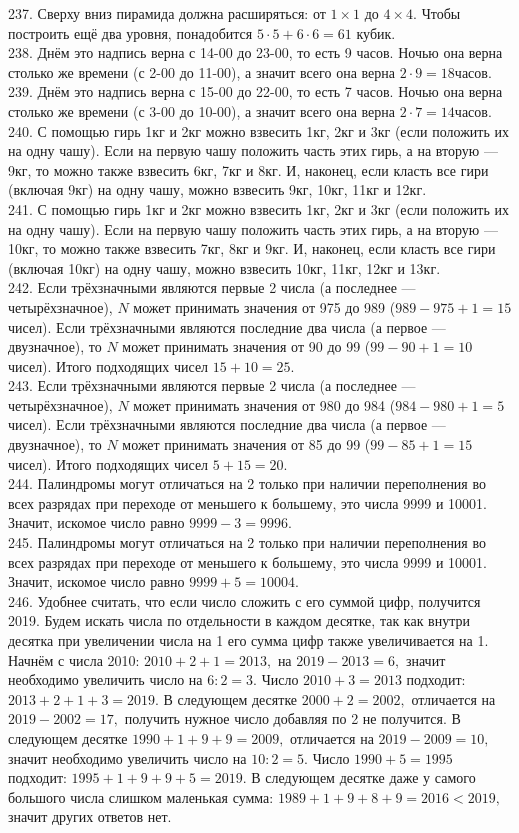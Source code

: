 \documentclass[12pt]{article}
\begin{document}
237. Сверху вниз пирамида должна расширяться: от $1\times1$ до $4\times4.$ Чтобы построить ещё два уровня, понадобится $5\cdot5+6\cdot6=61$ кубик.\\
238. Днём это надпись верна с 14-00 до 23-00, то есть 9 часов. Ночью она верна столько же времени (с 2-00 до 11-00), а значит всего она верна $2\cdot9=18$часов.\\
239. Днём это надпись верна с 15-00 до 22-00, то есть 7 часов. Ночью она верна столько же времени (с 3-00 до 10-00), а значит всего она верна $2\cdot7=14$часов.\\
240. С помощью гирь 1кг и 2кг можно взвесить 1кг, 2кг и 3кг (если положить их на одну чашу). Если на первую чашу положить часть этих гирь, а на вторую --- 9кг, то можно также взвесить 6кг, 7кг и 8кг. И, наконец, если класть все гири (включая 9кг) на одну чашу, можно взвесить 9кг, 10кг, 11кг и 12кг.\\
241. С помощью гирь 1кг и 2кг можно взвесить 1кг, 2кг и 3кг (если положить их на одну чашу). Если на первую чашу положить часть этих гирь, а на вторую --- 10кг, то можно также взвесить 7кг, 8кг и 9кг. И, наконец, если класть все гири (включая 10кг) на одну чашу, можно взвесить 10кг, 11кг, 12кг и 13кг.\\
242. Если трёхзначными являются первые 2 числа (а последнее --- четырёхзначное), $N$ может принимать значения от 975 до 989 ($989-975+1=15$ чисел). Если трёхзначными являются последние два числа (а первое --- двузначное), то $N$ может принимать значения от 90 до 99 ($99-90+1=10$ чисел). Итого подходящих чисел $15+10=25.$\\
243. Если трёхзначными являются первые 2 числа (а последнее --- четырёхзначное), $N$ может принимать значения от 980 до 984 ($984-980+1=5$ чисел). Если трёхзначными являются последние два числа (а первое --- двузначное), то $N$ может принимать значения от 85 до 99 ($99-85+1=15$ чисел). Итого подходящих чисел $5+15=20.$\\
244. Палиндромы могут отличаться на 2 только при наличии переполнения во всех разрядах при переходе от меньшего к большему, это числа 9999 и 10001. Значит, искомое число равно $9999-3=9996.$\\
245. Палиндромы могут отличаться на 2 только при наличии переполнения во всех разрядах при переходе от меньшего к большему, это числа 9999 и 10001. Значит, искомое число равно $9999+5=10004.$\\
246. Удобнее считать, что если число сложить с его суммой цифр, получится 2019. Будем искать числа по отдельности в каждом десятке, так как внутри десятка при увеличении числа на 1 его сумма цифр также увеличивается на 1. Начнём с числа 2010: $2010+2+1=2013,$ на $2019-2013=6,$ значит необходимо увеличить число на $6:2=3.$ Число $2010+3=2013$ подходит: $2013+2+1+3=2019.$ В следующем десятке $2000+2=2002,$ отличается на $2019-2002=17,$ получить нужное число добавляя по 2 не получится. В следующем десятке $1990+1+9+9=2009,$ отличается на $2019-2009=10,$ значит необходимо увеличить число на $10:2=5.$ Число $1990+5=1995$ подходит: $1995+1+9+9+5=2019.$ В следующем десятке даже у самого большого числа слишком маленькая сумма: $1989+1+9+8+9=2016<2019,$ значит других ответов нет.\\
\end{document}
